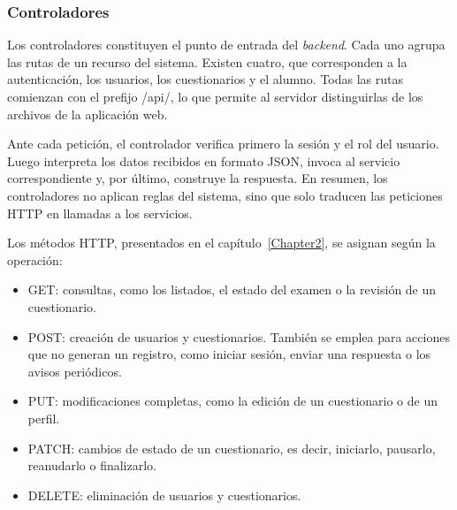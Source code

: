 
\subsubsection{Controladores}


Los controladores constituyen el punto de entrada del \emph{backend}. Cada uno agrupa las rutas de un recurso del sistema. Existen cuatro, que corresponden a la autenticación, los usuarios, los cuestionarios y el alumno. Todas las rutas comienzan con el prefijo /api/, lo que permite al servidor distinguirlas de los archivos de la aplicación web.

Ante cada petición, el controlador verifica primero la sesión y el rol del usuario. Luego interpreta los datos recibidos en formato JSON, invoca al servicio correspondiente y, por último, construye la respuesta. En resumen, los controladores no aplican reglas del sistema, sino que solo traducen las peticiones HTTP en llamadas a los servicios.

Los métodos HTTP, presentados en el capítulo~\ref{Chapter2}, se asignan según la operación:

\begin{itemize}

\item GET: consultas, como los listados, el estado del examen o la revisión de un cuestionario.

\item POST: creación de usuarios y cuestionarios. También se emplea para acciones que no generan un registro, como iniciar sesión, enviar una respuesta o los avisos periódicos.

\item PUT: modificaciones completas, como la edición de un cuestionario o de un perfil.

\item PATCH: cambios de estado de un cuestionario, es decir, iniciarlo, pausarlo, reanudarlo o finalizarlo.

\item DELETE: eliminación de usuarios y cuestionarios.

\end{itemize}

